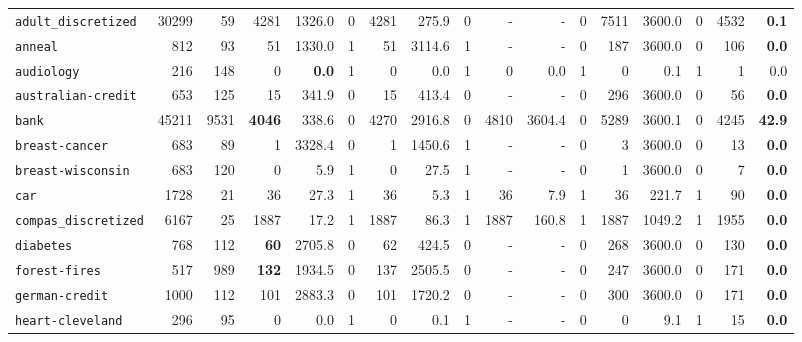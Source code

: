 \begin{tabular}{lccrrrrrrrrrrrrrr}
\texttt{adult\_discretized} & \multicolumn{1}{r}{30299} & \multicolumn{1}{r}{59}  & 4281 & 1326.0 & 0 & 4281 & 275.9 & 0 & - & - & 0 & 7511 & 3600.0 & 0 & 4532 & \textbf{0.1}\\
\texttt{anneal} & \multicolumn{1}{r}{812} & \multicolumn{1}{r}{93}  & 51 & 1330.0 & 1 & 51 & 3114.6 & 1 & - & - & 0 & 187 & 3600.0 & 0 & 106 & \textbf{0.0}\\
\texttt{audiology} & \multicolumn{1}{r}{216} & \multicolumn{1}{r}{148}  & 0 & \textbf{0.0} & 1 & 0 & 0.0 & 1 & 0 & 0.0 & 1 & 0 & 0.1 & 1 & 1 & 0.0\\
\texttt{australian-credit} & \multicolumn{1}{r}{653} & \multicolumn{1}{r}{125}  & 15 & 341.9 & 0 & 15 & 413.4 & 0 & - & - & 0 & 296 & 3600.0 & 0 & 56 & \textbf{0.0}\\
\texttt{bank} & \multicolumn{1}{r}{45211} & \multicolumn{1}{r}{9531}  & \textbf{4046} & 338.6 & 0 & 4270 & 2916.8 & 0 & 4810 & 3604.4 & 0 & 5289 & 3600.1 & 0 & 4245 & \textbf{42.9}\\
\texttt{breast-cancer} & \multicolumn{1}{r}{683} & \multicolumn{1}{r}{89}  & 1 & 3328.4 & 0 & 1 & 1450.6 & 1 & - & - & 0 & 3 & 3600.0 & 0 & 13 & \textbf{0.0}\\
\texttt{breast-wisconsin} & \multicolumn{1}{r}{683} & \multicolumn{1}{r}{120}  & 0 & 5.9 & 1 & 0 & 27.5 & 1 & - & - & 0 & 1 & 3600.0 & 0 & 7 & \textbf{0.0}\\
\texttt{car} & \multicolumn{1}{r}{1728} & \multicolumn{1}{r}{21}  & 36 & 27.3 & 1 & 36 & 5.3 & 1 & 36 & 7.9 & 1 & 36 & 221.7 & 1 & 90 & \textbf{0.0}\\
\texttt{compas\_discretized} & \multicolumn{1}{r}{6167} & \multicolumn{1}{r}{25}  & 1887 & 17.2 & 1 & 1887 & 86.3 & 1 & 1887 & 160.8 & 1 & 1887 & 1049.2 & 1 & 1955 & \textbf{0.0}\\
\texttt{diabetes} & \multicolumn{1}{r}{768} & \multicolumn{1}{r}{112}  & \textbf{60} & 2705.8 & 0 & 62 & 424.5 & 0 & - & - & 0 & 268 & 3600.0 & 0 & 130 & \textbf{0.0}\\
\texttt{forest-fires} & \multicolumn{1}{r}{517} & \multicolumn{1}{r}{989}  & \textbf{132} & 1934.5 & 0 & 137 & 2505.5 & 0 & - & - & 0 & 247 & 3600.0 & 0 & 171 & \textbf{0.0}\\
\texttt{german-credit} & \multicolumn{1}{r}{1000} & \multicolumn{1}{r}{112}  & 101 & 2883.3 & 0 & 101 & 1720.2 & 0 & - & - & 0 & 300 & 3600.0 & 0 & 171 & \textbf{0.0}\\
\texttt{heart-cleveland} & \multicolumn{1}{r}{296} & \multicolumn{1}{r}{95}  & 0 & 0.0 & 1 & 0 & 0.1 & 1 & - & - & 0 & 0 & 9.1 & 1 & 15 & \textbf{0.0}\\

\end{tabular}
